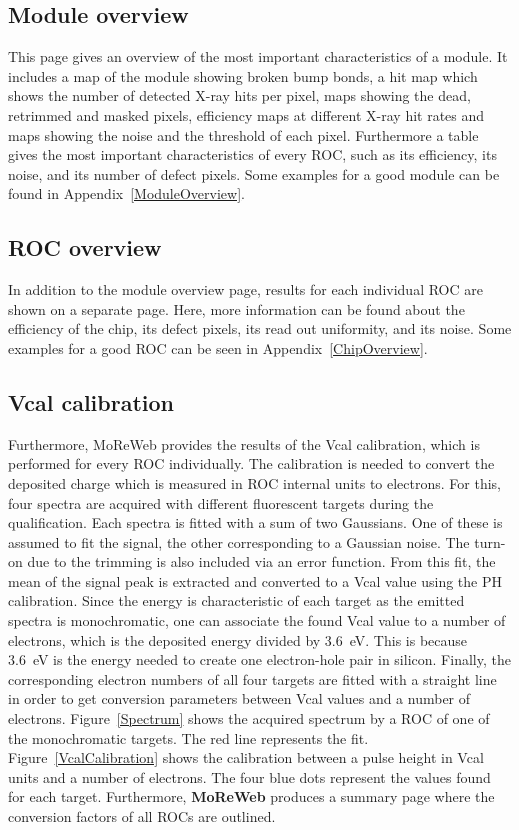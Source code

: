 \documentclass[a4paper,12pt,twoside]{article}
\begin{document}
\subsection{Module overview}

This page gives an overview of the most important characteristics of a module. It includes a map of the module showing broken bump bonds, a hit map which shows the number of detected X-ray hits per pixel, maps showing the dead, retrimmed and masked pixels, efficiency maps at different X-ray hit rates and maps showing the noise and the threshold of each pixel. Furthermore a table gives the most important characteristics of every ROC, such as its efficiency, its noise, and its number of defect pixels. Some examples for a good module can be found in Appendix~\ref{ModuleOverview}.

\subsection{ROC overview}

In addition to the module overview page, results for each individual ROC are shown on a separate page. Here, more information can be found about the efficiency of the chip, its defect pixels, its read out uniformity, and its noise. Some examples for a good ROC can be seen in Appendix~\ref{ChipOverview}.

\subsection{Vcal calibration}

Furthermore, MoReWeb provides the results of the Vcal calibration, which is performed for every ROC individually. The calibration is needed to convert the deposited charge which is measured in ROC internal units to electrons. For this, four spectra are acquired with different fluorescent targets during the qualification. Each spectra is fitted with a sum of two Gaussians. One of these is assumed to fit the signal, the other corresponding to a Gaussian noise. The turn-on due to the trimming is also included via an error function. From this fit, the mean of the signal peak is extracted and converted to a Vcal value using the PH calibration. Since the energy is characteristic of each target as the emitted spectra is monochromatic, one can associate the found Vcal value to a number of electrons, which is the deposited energy divided by \SI{3.6}{\electronvolt}. This is because \SI{3.6}{\electronvolt} is the energy needed to create one electron-hole pair in silicon. Finally, the corresponding electron numbers of all four targets are fitted with a straight line in order to get conversion parameters between Vcal values and a number of electrons. Figure~\ref{Spectrum} shows the acquired spectrum by a ROC of one of the monochromatic targets. The red line represents the fit. Figure~\ref{VcalCalibration} shows the calibration between a pulse height in Vcal units and a number of electrons. The four blue dots represent the values found for each target. Furthermore, \textbf{MoReWeb} produces a summary page where the conversion factors of all ROCs are outlined. 
\end{document}
